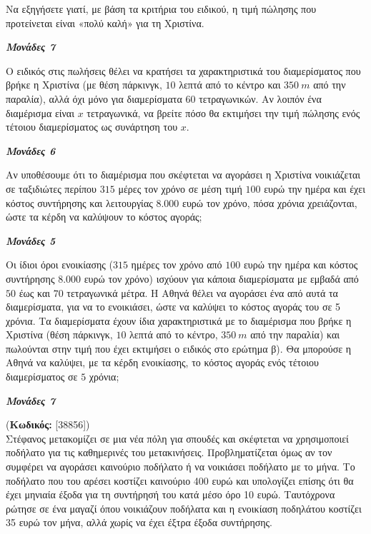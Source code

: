 \documentclass[11pt,a4paper,twoside]{book}
\newcounter{askhsh}[chapter]
\renewcommand{\theaskhsh}{
	\bf{\titlefont{\Large{\thechapter}}.\arabic{askhsh}}
}
\newcommand{\Askhsh}[2]{\refstepcounter{askhsh}{\titlefont{Άσκηση\theaskhsh} - \textcolor{maincolor}{ΘΕΜΑ #2}} (\small{\textbf{Κωδικός:} #1})\\}{}
\newcommand{\monades}[1]{
\hspace*{\fill}
\textbf{\textit{\textcolor{maincolor}{Μονάδες #1}}}}
\begin{document}
\begin{alist}
\item Να εξηγήσετε γιατί, με βάση τα κριτήρια του ειδικού, η τιμή πώλησης που προτείνεται είναι «πολύ καλή» για τη Χριστίνα.
\monades{7}
\item Ο ειδικός στις πωλήσεις θέλει να κρατήσει τα χαρακτηριστικά του διαμερίσματος που βρήκε η Χριστίνα (με θέση πάρκινγκ, $10$ λεπτά από το κέντρο και $350\ m$ από την παραλία), αλλά όχι μόνο για διαμερίσματα $60$ τετραγωνικών. Αν λοιπόν ένα διαμέρισμα είναι $x$ τετραγωνικά, να βρείτε πόσο θα εκτιμήσει την τιμή πώλησης ενός τέτοιου διαμερίσματος ως συνάρτηση του $x$.
\monades{6}
\item

\begin{rlist}
\item Αν υποθέσουμε ότι το διαμέρισμα που σκέφτεται να αγοράσει η Χριστίνα νοικιάζεται σε ταξιδιώτες περίπου $315$ μέρες τον χρόνο σε μέση τιμή $100$ ευρώ την ημέρα και έχει κόστος συντήρησης και λειτουργίας $8.000$ ευρώ τον χρόνο, πόσα χρόνια χρειάζονται, ώστε τα κέρδη να καλύψουν το κόστος αγοράς;
\monades{5}
\item Οι ίδιοι όροι ενοικίασης ($315$ ημέρες τον χρόνο από $100$ ευρώ την ημέρα και κόστος συντήρησης $8.000$ ευρώ τον χρόνο) ισχύουν για κάποια διαμερίσματα με εμβαδά από $50$ έως και $70$ τετραγωνικά μέτρα. Η Αθηνά θέλει να αγοράσει ένα από αυτά τα διαμερίσματα, για να το ενοικιάσει, ώστε να καλύψει το κόστος αγοράς του σε 5 χρόνια. Τα διαμερίσματα έχουν ίδια χαρακτηριστικά με το διαμέρισμα που βρήκε η Χριστίνα (θέση πάρκινγκ, $10$ λεπτά από το κέντρο, $350\ m$ από την παραλία) και πωλούνται στην τιμή που έχει εκτιμήσει ο ειδικός στο ερώτημα β). Θα μπορούσε η Αθηνά να καλύψει, με τα κέρδη ενοικίασης, το κόστος αγοράς ενός τέτοιου διαμερίσματος σε $5$ χρόνια;
\monades{7}
\end{rlist}
\end{alist}

\vspace{4mm}

\Askhsh{[38856]}
Ο Στέφανος μετακομίζει σε μια νέα πόλη για σπουδές και σκέφτεται να χρησιμοποιεί ποδήλατο για τις καθημερινές του μετακινήσεις. Προβληματίζεται όμως αν τον συμφέρει να αγοράσει καινούριο ποδήλατο ή να νοικιάσει ποδήλατο με το μήνα. Το ποδήλατο που του αρέσει κοστίζει καινούριο 400 ευρώ και υπολογίζει επίσης ότι θα έχει μηνιαία έξοδα για τη συντήρησή του κατά μέσο όρο 10 ευρώ. Ταυτόχρονα ρώτησε σε ένα μαγαζί όπου νοικιάζουν ποδήλατα και η ενοικίαση ποδηλάτου κοστίζει 35 ευρώ τον μήνα, αλλά χωρίς να έχει έξτρα έξοδα συντήρησης.
\end{document}
